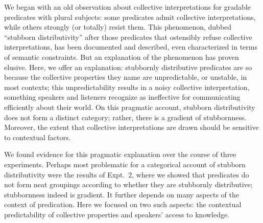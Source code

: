 \documentclass[preprint,12pt,authoryear,titlepage]{elsarticle}
\newcommand{\ndg}[1]{\textcolor{Green}{[ndg: #1]}}
\begin{document}
We began with an old observation about collective interpretations for gradable predicates with plural subjects: some predicates admit collective interpretations, while others strongly (or totally) resist them. This phenomenon, dubbed ``stubborn distributivity'' after those predicates that ostensibly refuse collective interpretations, has been documented and described, even characterized in terms of semantic constraints. But an explanation of the phenomenon has proven elusive. Here, we offer an explanation: stubbornly distributive predicates are so because the collective properties they name are unpredictable, or unstable, in most contexts; this unpredictability results in a noisy collective interpretation, something speakers and listeners recognize as ineffective for communicating efficiently about their world.
On this pragmatic account, stubborn distributivity does not form a distinct category; rather, there is a gradient of stubbornness. Moreover, the extent that collective interpretations are drawn should be sensitive to contextual factors.



We found evidence for this pragmatic explanation over the course of three experiments. Perhaps most problematic for a categorical account of stubborn distributivity were the results of Expt.~2, where we showed that predicates do not form neat groupings according to whether they are stubbornly distributive; stubbornness indeed is gradient. It further depends on many aspects of the context of predication. Here we focused on two such aspects: the contextual predictability of collective properties and speakers' access to knowledge.
\end{document}
